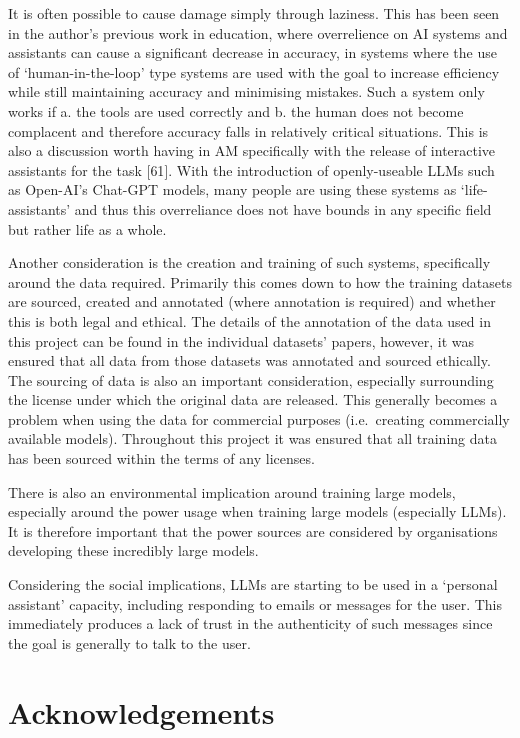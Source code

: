 \documentclass[twocolumn]{article}
\begin{document}
It is often possible to cause damage simply through laziness. This has
been seen in the author's previous work in education, where overrelience
on AI systems and assistants can cause a significant decrease in
accuracy, in systems where the use of `human-in-the-loop' type systems
are used with the goal to increase efficiency while still maintaining
accuracy and minimising mistakes. Such a system only works if a. the
tools are used correctly and b. the human does not become complacent and
therefore accuracy falls in relatively critical situations. This is also
a discussion worth having in AM specifically with the release of
interactive assistants for the task {[}61{]}. With the introduction of
openly-useable LLMs such as Open-AI's Chat-GPT models, many people are
using these systems as `life-assistants' and thus this overreliance does
not have bounds in any specific field but rather life as a whole.

Another consideration is the creation and training of such systems,
specifically around the data required. Primarily this comes down to how
the training datasets are sourced, created and annotated (where
annotation is required) and whether this is both legal and ethical. The
details of the annotation of the data used in this project can be found
in the individual datasets' papers, however, it was ensured that all
data from those datasets was annotated and sourced ethically. The
sourcing of data is also an important consideration, especially
surrounding the license under which the original data are released. This
generally becomes a problem when using the data for commercial purposes
(i.e.~creating commercially available models). Throughout this project
it was ensured that all training data has been sourced within the terms
of any licenses.

There is also an environmental implication around training large models,
especially around the power usage when training large models (especially
LLMs). It is therefore important that the power sources are considered
by organisations developing these incredibly large models.

Considering the social implications, LLMs are starting to be used in a
`personal assistant' capacity, including responding to emails or
messages for the user. This immediately produces a lack of trust in the
authenticity of such messages since the goal is generally to talk to the
user.

\section*{Acknowledgements}\label{acknowledgements}
\end{document}
